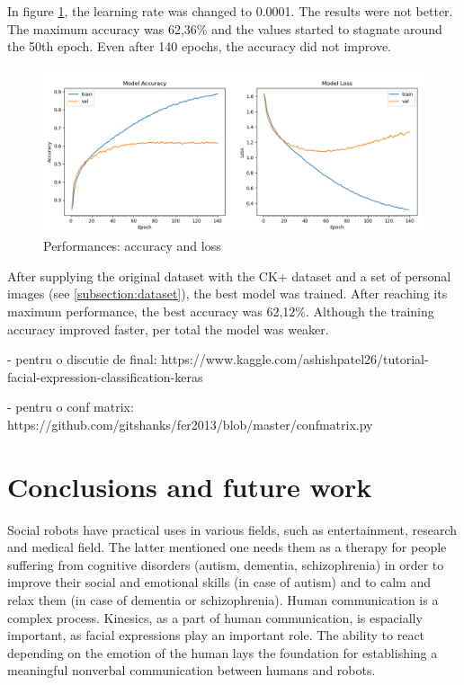 \documentclass[runningheads,a4paper,12pt]{report}
\begin{document}
In figure \ref{fig:result2}, the learning rate was changed to 0.0001. The results were not better. The maximum accuracy was 62,36\% and the values started to stagnate around the 50th epoch. Even after 140 epochs, the accuracy did not improve.

\begin{figure}[h]
	\centering
	\includegraphics[width=\linewidth]{./images/3_results2}\hfill	
	\caption{Performances: accuracy and loss}  
    \label{fig:result2}
\end{figure}

After supplying the original dataset with the CK+ dataset and a set of personal images (see \ref{subsection:dataset}), the best model was trained. After reaching its maximum performance, the best accuracy was 62,12\%. Although the training accuracy improved faster, per total the model was weaker. 

- pentru o discutie de final: https://www.kaggle.com/ashishpatel26/tutorial-facial-expression-classification-keras

- pentru o conf matrix: https://github.com/gitshanks/fer2013/blob/master/confmatrix.py

\chapter*{Conclusions and future work}

Social robots have practical uses in various fields, such as entertainment, research and medical field. The latter mentioned one needs them as a therapy for people suffering from cognitive disorders (autism, dementia, schizophrenia) in order to improve their social and emotional skills (in case of autism) and to calm and relax them (in case of dementia or schizophrenia). Human communication is a complex process. Kinesics, as a part of human communication, is espacially important, as facial expressions play an important role. The ability to react depending on the emotion of the human lays the foundation for establishing a meaningful nonverbal communication between humans and robots.
\end{document}
